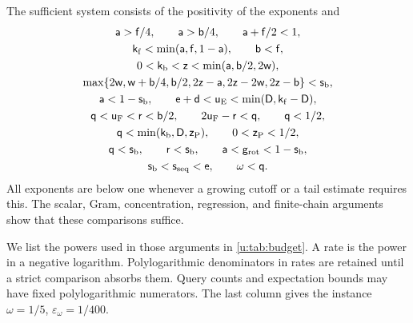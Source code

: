 The sufficient system consists of the positivity of the exponents and
\begin{equation}\label{u:eq:comparison-system}
 \begin{gathered}
  \mathsf{a}>\mathsf{f}/4,\qquad \mathsf{a}>\mathsf{b}/4,\qquad
  \mathsf{a}+\mathsf{f}/2<1,\\
  \mathsf{k}_{\rm f}<\min(\mathsf{a},\mathsf{f},1-\mathsf{a}),\qquad \mathsf{b}<\mathsf{f},\\
  0<\mathsf{k}_{\rm b}<\mathsf{z}<\min(\mathsf{a},\mathsf{b}/2,2\mathsf{w}),\\
  \max\{2\mathsf{w},\mathsf{w}+\mathsf{b}/4,\mathsf{b}/2,
          2\mathsf{z}-\mathsf{a},2\mathsf{z}-2\mathsf{w},2\mathsf{z}-\mathsf{b}\}<\mathsf{s}_{\rm b},\\
  \mathsf{a}<1-\mathsf{s}_{\rm b},\qquad
  \mathsf{e}+\mathsf{d}<\mathsf{u}_{\rm E}<\min(\mathsf{D},\mathsf{k}_{\rm f}-\mathsf{D}),\\
  \mathsf{q}<\mathsf{u}_{\rm F}<\mathsf{r}<\mathsf{b}/2,\qquad
  2\mathsf{u}_{\rm F}-\mathsf{r}<\mathsf{q},\qquad \mathsf{q}<1/2,\\
  \mathsf{q}<\min(\mathsf{k}_{\rm b},\mathsf{D},\mathsf{z}_{\rm P}),\qquad
  0<\mathsf{z}_{\rm P}<1/2,\\
  \mathsf{q}<\mathsf{s}_{\rm b},\qquad \mathsf{r}<\mathsf{s}_{\rm b},\qquad
  \mathsf{a}<\mathsf{g}_{\rm rot}<1-\mathsf{s}_{\rm b},\\
  \mathsf{s}_{\rm b}<\mathsf{s}_{\rm seq}<\mathsf{e},\qquad \omega<\mathsf{q}.
 \end{gathered}
\end{equation}
All exponents are below one whenever a growing cutoff or a tail
estimate requires this. The scalar, Gram, concentration, regression,
and finite-chain arguments show that these comparisons suffice.

We list the powers used in those arguments in
\cref{u:tab:budget}. A rate is the power in a negative logarithm.
Polylogarithmic denominators in rates are retained until a strict
comparison absorbs them. Query counts and expectation bounds may
have fixed polylogarithmic numerators. The last column gives the
instance $\omega=1/5$, $\varepsilon_\omega=1/400$.


